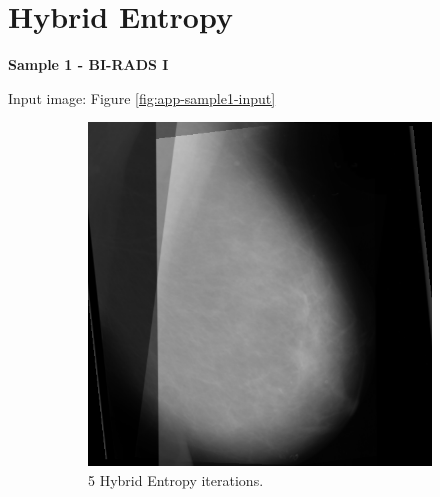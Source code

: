 \newpage
\section{Hybrid Entropy}

\noindent \textbf{Sample 1 - BI-RADS I}

Input image: Figure \ref{fig:app-sample1-input}

\begin{figure}[H]
    \centering
    \begin{subfigure}[t]{0.3\textwidth}
        \includegraphics[width=\textwidth]{Appendix5/sample1/hybrid/hybrid-5.png}
        \caption{5 Hybrid Entropy iterations.}
        \label{fig:app-5-hybrid-sample1}
    \end{subfigure} \hfill
    ~ %
    \begin{subfigure}[t]{0.3\textwidth}

\end{subfigure}
\end{figure}
